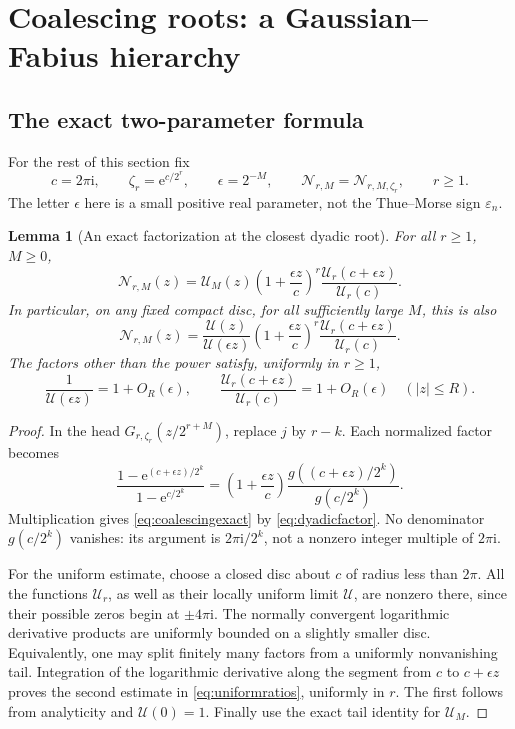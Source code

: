\documentclass[11pt,letterpaper]{article}
\numberwithin{equation}{section}
\newtheorem{lemma}[theorem]{Lemma}
\theoremstyle{definition}
\theoremstyle{remark}
\newcommand{\eps}{\varepsilon}
\newcommand{\ii}{\mathrm i}
\newcommand{\Up}{\mathcal U}
\newcommand{\Np}{\mathcal N}
\newcommand{\e}{\mathrm e}
\begin{document}
\section{Coalescing roots: a Gaussian--Fabius hierarchy}
\label{sec:coalescing}

\subsection{The exact two-parameter formula}
For the rest of this section fix
\begin{equation}
 c=2\pi\ii,\qquad \zeta_r=\e^{c/2^r},\qquad
 \epsilon=2^{-M},\qquad
 \Np_{r,M}=\Np_{r,M,\zeta_r},\qquad r\geq1.
 \label{eq:coalescingsetup}
\end{equation}
The letter \(\epsilon\) here is a small positive real parameter, not the Thue--Morse sign \(\eps_n\).

\begin{lemma}[An exact factorization at the closest dyadic root]
For all \(r\geq1\), \(M\geq0\),
\begin{equation}
 \Np_{r,M}(z)
 =\Up_M(z)\left(1+\frac{\epsilon z}{c}\right)^r
              \frac{\Up_r(c+\epsilon z)}{\Up_r(c)}.
 \label{eq:coalescingexact}
\end{equation}
In particular, on any fixed compact disc, for all sufficiently large \(M\), this is also
\begin{equation}
 \Np_{r,M}(z)
 =\frac{\Up(z)}{\Up(\epsilon z)}
  \left(1+\frac{\epsilon z}{c}\right)^r
  \frac{\Up_r(c+\epsilon z)}{\Up_r(c)}.
 \label{eq:coalescingquotient}
\end{equation}
The factors other than the power satisfy, uniformly in \(r\geq1\),
\begin{equation}
 \frac1{\Up(\epsilon z)}=1+O_R(\epsilon),\qquad
 \frac{\Up_r(c+\epsilon z)}{\Up_r(c)}=1+O_R(\epsilon)
 \quad (|z|\leq R).
 \label{eq:uniformratios}
\end{equation}
\end{lemma}
\begin{proof}
In the head \(G_{r,\zeta_r}(z/2^{r+M})\), replace \(j\) by \(r-k\). Each normalized factor becomes
\[
 \frac{1-\e^{(c+\epsilon z)/2^k}}{1-\e^{c/2^k}}
 =\left(1+\frac{\epsilon z}{c}\right)
       \frac{g((c+\epsilon z)/2^k)}{g(c/2^k)}.
\]
Multiplication gives \eqref{eq:coalescingexact} by \eqref{eq:dyadicfactor}. No denominator \(g(c/2^k)\) vanishes: its argument is \(2\pi\ii/2^k\), not a nonzero integer multiple of \(2\pi\ii\).

For the uniform estimate, choose a closed disc about \(c\) of radius less than \(2\pi\). All the functions \(\Up_r\), as well as their locally uniform limit \(\Up\), are nonzero there, since their possible zeros begin at \(\pm4\pi\ii\). The normally convergent logarithmic derivative products are uniformly bounded on a slightly smaller disc. Equivalently, one may split finitely many factors from a uniformly nonvanishing tail. Integration of the logarithmic derivative along the segment from \(c\) to \(c+\epsilon z\) proves the second estimate in \eqref{eq:uniformratios}, uniformly in \(r\). The first follows from analyticity and \(\Up(0)=1\). Finally use the exact tail identity for \(\Up_M\).
\end{proof}
\end{document}
